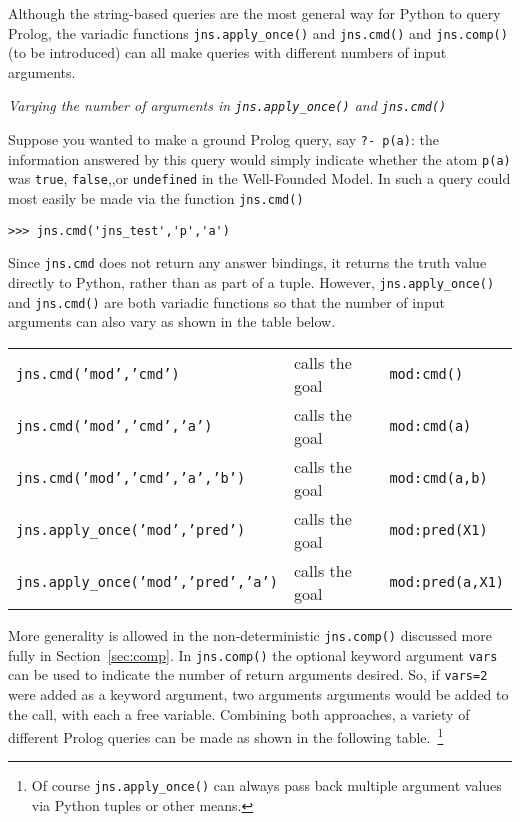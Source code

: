 Although the string-based queries are the most general way for Python
to query Prolog, the variadic functions {\tt jns.apply\_once()} and
{\tt jns.cmd()} and {\tt jns.comp()} (to be introduced) can all make
queries with different numbers of input arguments.

\begin{example} \rm {\it Varying the number of arguments in {\tt jns.apply\_once()} and {\tt jns.cmd()} } \label{ex:variadic-examples}

Suppose you wanted to make a ground Prolog query, say {\tt ?- p(a)}:
the information answered by this query would simply indicate whether
the atom {\tt p(a)} was {\tt true}, {\tt false},,or {\tt undefined} in
the Well-Founded Model. In \januspy{} such a query could most easily
be made via the \januspy{} function {\tt jns.cmd()}

\begin{verbatim}  
>>> jns.cmd('jns_test','p','a')  
\end{verbatim}  

Since {\tt jns.cmd} does not return any answer bindings, it
returns the truth value directly to Python, rather than as part of a
tuple.  However, {\tt jns.apply\_once()} and {\tt jns.cmd()} are both
variadic functions so that the number of input arguments can also vary
as shown in the table below.

\begin{tabular}{lll}
  {\tt jns.cmd('mod','cmd')}                & calls the goal & {\tt mod:cmd()}\\
  {\tt jns.cmd('mod','cmd','a')}            & calls the goal & {\tt mod:cmd(a)}\\
  {\tt jns.cmd('mod','cmd','a','b')}        & calls the goal & {\tt mod:cmd(a,b)}\\
  {\tt jns.apply\_once('mod','pred')}              & calls the goal & {\tt mod:pred(X1)} \\
  {\tt jns.apply\_once('mod','pred','a')}          & calls the goal & {\tt mod:pred(a,X1)} \\
\end{tabular}

More generality is allowed in the non-deterministic {\tt jns.comp()}
discussed more fully in Section~\ref{sec:comp}.  In {\tt jns.comp()}
the optional keyword argument {\tt vars} can be used to indicate the
number of return arguments desired.  So, if {\tt vars=2} were added as
a keyword argument, two arguments arguments would be added to the
call, with each a free variable.  Combining both approaches, a variety
of different Prolog queries can be made as shown in the following
table.~\footnote{
Of course {\tt jns.apply\_once()} can always pass back multiple
argument values via Python tuples or other means.}


\end{example}
